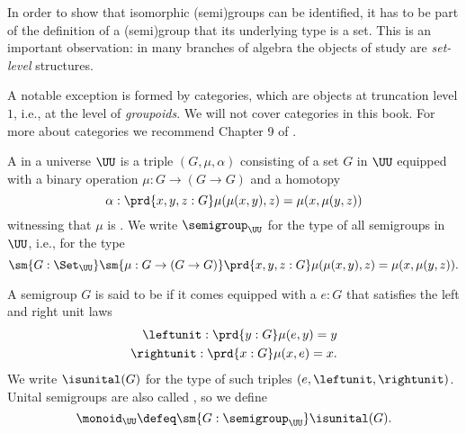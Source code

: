 \begin{rmk}
  In order to show that isomorphic (semi)groups can be identified, it has to be part of the definition of a (semi)group that its underlying type is a set. This is an important observation: in many branches of algebra the objects of study are \emph{set-level} structures.

  A notable exception is formed by categories, which are objects at truncation level $1$, i.e., at the level of \emph{groupoids}. We will not cover categories in this book. For more about categories we recommend Chapter 9 of \cite{hottbook}.
\end{rmk}

\begin{defn}
  A  in a universe $\UU$ is a triple $(G,\mu,\alpha)$ consisting of a set $G$ in $\UU$ equipped with a binary operation $\mu:G\to (G\to G)$ and a homotopy
  \begin{equation*}
    \alpha : \prd{x,y,z:G}\mu(\mu(x,y),z)=\mu(x,\mu(y,z))
  \end{equation*}
  witnessing that $\mu$ is .
  We write $\semigroup_\UU$ for the type of all semigroups in $\UU$, i.e., for the type
  \begin{equation*}
    \sm{G:\Set_\UU}\sm{\mu:G\to(G\to G)}\prd{x,y,z:G}\mu(\mu(x,y),z)=\mu(x,\mu(y,z)).
  \end{equation*}
\end{defn}

\begin{defn}
  A semigroup $G$ is said to be  if it comes equipped with a  $e:G$ that satisfies the left and right unit laws
  \begin{align*}
    \leftunit : \prd{y:G}\mu(e,y)=y \\
    \rightunit : \prd{x:G}\mu(x,e)=x.
  \end{align*}
  We write $\isunital(G)$ for the type of such triples $(e,\leftunit,\rightunit)$. Unital semigroups are also called , so we define
  \begin{equation*}
    \monoid_\UU\defeq\sm{G:\semigroup_\UU}\isunital(G).
  \end{equation*}
\end{defn}

